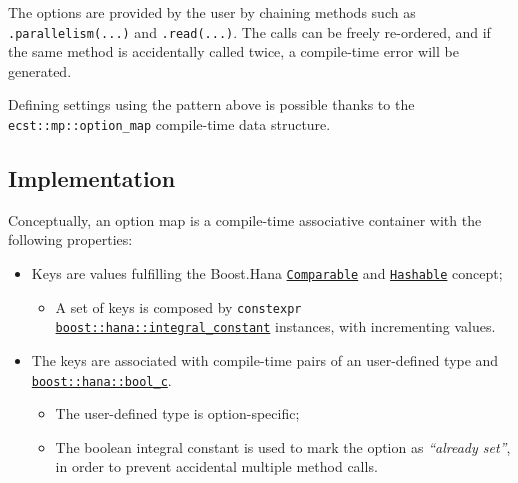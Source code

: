 \documentclass[twoside, 12pt, a4paper, openright]{book}
\providecommand{\tightlist}{%
  \setlength{\itemsep}{0pt}\setlength{\parskip}{0pt}}
\begin{document}
The options are provided by the user by chaining methods such as
\texttt{.parallelism(...)}
and
\texttt{.read(...)}.
The calls can be freely re-ordered, and if the same method is
accidentally called twice, a compile-time error will be generated.

Defining settings using the pattern above is possible thanks to the
\texttt{ecst::mp::option_map}
compile-time data structure.

\subsection{Implementation}\label{implementation-4}

Conceptually, an option map is a compile-time associative container with
the following properties:

\begin{itemize}
\item
  Keys are values fulfilling the Boost.Hana
  \href{http://www.boost.org/doc/libs/1_61_0/libs/hana/doc/html/group__group-Comparable.html}{\texttt{Comparable}}
  and
  \href{http://www.boost.org/doc/libs/1_61_0/libs/hana/doc/html/group__group-Hashable.html}{\texttt{Hashable}}
  concept;

  \begin{itemize}
  \tightlist
  \item
    A set of keys is composed by
    \texttt{constexpr}
    \href{http://www.boost.org/doc/libs/1_61_0/libs/hana/doc/html/structboost_1_1hana_1_1integral__constant.html}{\texttt{boost::hana::integral_constant}}
    instances, with incrementing values.
  \end{itemize}
\item
  The keys are associated with compile-time pairs of an user-defined
  type and
  \href{http://www.boost.org/doc/libs/1_61_0/libs/hana/doc/html/structboost_1_1hana_1_1integral__constant.html\#aa301b96de91d665fdc846bde4659b0d3}{\texttt{boost::hana::bool_c}}.

  \begin{itemize}
  \item
    The user-defined type is option-specific;
  \item
    The boolean integral constant is used to mark the option as
    \emph{``already set''}, in order to prevent accidental multiple
    method calls.
  \end{itemize}
\end{itemize}
\end{document}

